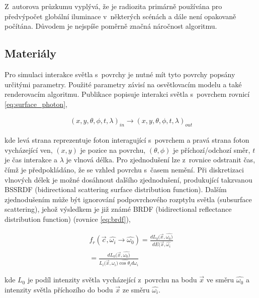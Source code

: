 Z~autorova průzkumu vyplývá, že je radiozita primárně používána pro předvýpočet globální iluminace v~některých scénách a dále není opakovaně počítána. Důvodem je nejspíše poměrně značná náročnost algoritmu.

\subsection{Materiály}
Pro simulaci interakce světla s~povrchy je nutné mít tyto povrchy popsány určitými parametry. Použité parametry závisí na osvětlovacím modelu a také renderovacím algoritmu. Publikace \cite{materials} popisuje interakci světla s~povrchem rovnicí \ref{eq:surface_photon},

\begin{equation} \label{eq:surface_photon}
	\begin{gathered}
		(x, y, \theta, \phi, t, \lambda)_{in} \xrightarrow{} (x, y, \theta, \phi, t, \lambda)_{out}
	\end{gathered}
\end{equation}

kde levá strana reprezentuje foton interagující s~povrchem a pravá strana foton vycházející ven, $(x, y)$ je pozice na povrchu, $(\theta, \phi)$ je příchozí/odchozí směr, $t$ je čas interakce a $\lambda$ je vlnová délka. Pro zjednodušení lze z~rovnice odstranit čas, čímž je předpokládáno, že se vzhled povrchu s~časem nemění. Při diskretizaci vlnových délek je možné dosáhnout dalšího zjednodušení, produkující takzvanou BSSRDF (bidirectional scattering surface distribution function). Dalším zjednodušením může být ignorování podpovrchového rozptylu světla (subsurface scattering), jehož výsledkem je již známé BRDF (bidirectional reflectance distribution function) (rovnice \ref{eq:brdf}),

\begin{equation} \label{eq:brdf}
	\begin{gathered}
		f_r(\vec{c}, \hat{\omega_i} \xrightarrow{} \hat{\omega_0}) = \frac{dL_0(\vec{x}, \hat{\omega_0)}}{dE(\vec{x}, \hat{\omega_i}} \\
		= \frac{dL_0(\vec{x}, \hat{\omega_0)}}{L_i(\vec{x}, \hat{\omega_i)\cos \theta_i d\omega_i}}
	\end{gathered}
\end{equation}

kde $L_0$ je podíl intenzity světla vycházející z~povrchu na bodu $\vec{x}$ ve směru $\hat{\omega_0}$ a intenzity světla příchozího do bodu $\vec{x}$ ze směru $\hat{\omega_i}$.

